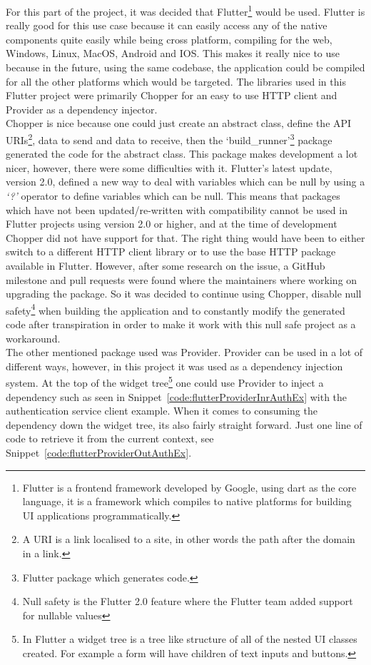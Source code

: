 \documentclass{article}
\begin{document}
\begin{multicols}{2}
For this part of the project, it was decided that Flutter\footnote{Flutter\cite{flutter} is a frontend framework developed by Google, using dart as the core language, it is a framework which compiles to native platforms for building UI applications programmatically.} would be used. Flutter is really good for this use case because it can easily access any of the native components quite easily while being cross platform, compiling for the web, Windows, Linux, MacOS, Android and IOS. This makes it really nice to use because in the future, using the same codebase, the application could be compiled for all the other platforms which would be targeted. The libraries used in this Flutter project were primarily Chopper\cite{chopper} for an easy to use HTTP client and Provider\cite{provider} as a dependency injector.\\
Chopper is nice because one could just create an abstract class, define the API URIs\footnote{A URI is a link localised to a site, in other words the path after the domain in a link.}, data to send and data to receive, then the `build\_runner'\footnote{Flutter package which generates code.} package generated the code for the abstract class. This package makes development a lot nicer, however, there were some difficulties with it. Flutter's latest update, version 2.0, defined a new way to deal with variables which can be null by using a \textit{`?'} operator to define variables which can be null. This means that packages which have not been updated/re-written with compatibility cannot be used in Flutter projects using version 2.0 or higher, and at the time of development Chopper did not have support for that. The right thing would have been to either switch to a different HTTP client library or to use the base HTTP package available in Flutter. However, after some research on the issue, a GitHub milestone\cite{chopperMileStone} and pull requests were found where the maintainers where working on upgrading the package. So it was decided to continue using Chopper, disable null safety\footnote{Null safety is the Flutter 2.0 feature where the Flutter team added support for nullable values} when building the application and to constantly modify the generated code after transpiration in order to make it work with this null safe project as a workaround.\\
The other mentioned package used was Provider. Provider can be used in a lot of different ways, however, in this project it was used as a dependency injection system. At the top of the widget tree\footnote{In Flutter a widget tree is a tree like structure of all of the nested UI classes created. For example a form will have children of text inputs and buttons.} one could use Provider to inject a dependency such as seen in Snippet~\ref{code:flutterProviderInrAuthEx} with the authentication service client example. When it comes to consuming the dependency down the widget tree, its also fairly straight forward. Just one line of code to retrieve it from the current context, see Snippet~\ref{code:flutterProviderOutAuthEx}.\\


\end{multicols}
\end{document}
